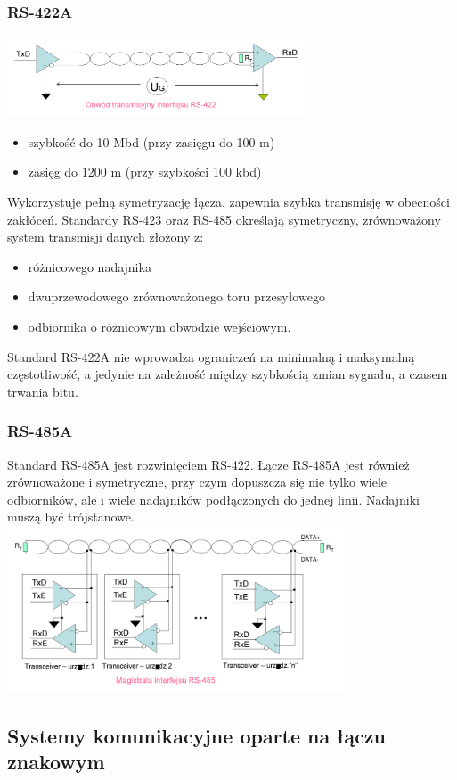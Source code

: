 \documentclass[a4paper,twoside]{article}
\begin{document}
		\subsubsection{RS-422A}
		\includegraphics[width=9cm]{./wyklady/RS232_12_2.pdf}
		\begin{itemize}
			\item szybkość do 10 Mbd (przy zasięgu do 100 m)
			\item zasięg do 1200 m (przy szybkości 100 kbd)
		\end{itemize}
		Wykorzystuje pełną symetryzację łącza, zapewnia szybka transmisję w obecności zakłóceń. Standardy RS-423 oraz RS-485 określają symetryczny, zrównoważony system transmisji danych złożony z:
		\begin{itemize}
			\item różnicowego nadajnika
			\item dwuprzewodowego zrównoważonego toru przesyłowego
			\item odbiornika o różnicowym obwodzie wejściowym.
		\end{itemize}
		Standard RS-422A nie wprowadza ograniczeń na minimalną i maksymalną częstotliwość, a jedynie na zależność między szybkością zmian sygnału, a czasem trwania bitu.
		\subsubsection{RS-485A}
		Standard RS-485A jest rozwinięciem RS-422. Łącze RS-485A jest również zrównoważone i symetryczne, przy czym dopuszcza się nie tylko wiele odbiorników, ale i wiele nadajników podłączonych do jednej linii. Nadajniki muszą być trójstanowe.\\
		\includegraphics[width=10cm]{./wyklady/RS232_13_1.pdf}
	\subsection{Systemy komunikacyjne oparte na łączu znakowym}
\end{document}
